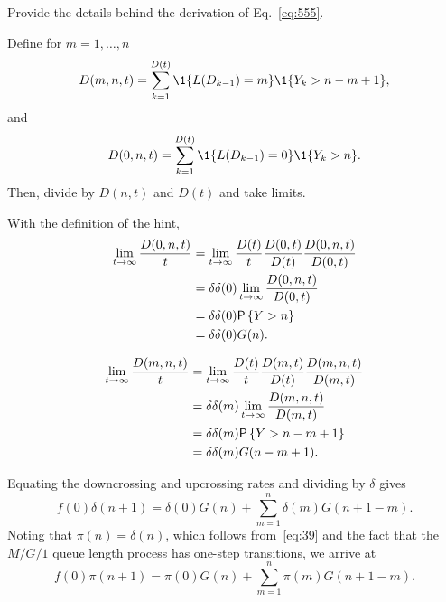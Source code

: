 \begin{exercise}
Provide the details behind the derivation of Eq.~\ref{eq:555}.
\begin{hint}
Define for $m=1,\ldots, n$
\begin{equation*}
  D(m, n, t) = \sum_{k=1}^{D(t)}\1{L(D_{k-1})=m}\1{Y_k>n-m+1},
\end{equation*}
and 
\begin{equation*}
  D(0, n, t) = \sum_{k=1}^{D(t)}\1{L(D_{k-1})=0}\1{Y_k>n}.
\end{equation*}
Then, divide by $D(n,t)$ and $D(t)$ and take limits.
\end{hint}
\begin{solution}
With the definition of the hint, 
\begin{equation*}
  \begin{split}
  \lim_{t\to\infty} \frac{  D(0, n, t)}t 
&=   \lim_{t\to\infty}  \frac{D(t)}t \frac{D(0, t)}{D(t)}\frac{ D(0, n, t)}{D(0,t)} \\
&=   \delta \delta(0) \lim_{t\to\infty} \frac{ D(0, n, t)}{D(0,t)} \\
&=   \delta \delta(0) \P{Y>n}\\
& = \delta \delta(0) G(n).
  \end{split}
\end{equation*}

\begin{equation*}
  \begin{split}
  \lim_{t\to\infty} \frac{  D(m, n, t)}t 
&=   \lim_{t\to\infty}  \frac{D(t)}t \frac{D(m, t)}{D(t)}\frac{ D(m, n, t)}{D(m,t)} \\
&=   \delta \delta(m) \lim_{t\to\infty} \frac{ D(m, n, t)}{D(m,t)} \\
&=   \delta \delta(m) \P{Y>n-m+1}\\
& = \delta \delta(m) G(n-m+1).
  \end{split}
\end{equation*}
\end{solution}
\end{exercise}

Equating the downcrossing and upcrossing rates and dividing
by $\delta$ gives
\begin{equation*}
  f(0) \delta(n+1) = \delta(0) G(n) + \sum_{m=1}^{n} \delta(m) G(n+1-m).
\end{equation*}
Noting that $\pi(n) = \delta(n)$, which follows from~\eqref{eq:39} and
the fact that the $M/G/1$ queue length process has one-step
transitions, we arrive at
\begin{equation}\label{eq:72}
  f(0) \pi(n+1) = \pi(0) G(n) + \sum_{m=1}^{n} \pi(m) G(n+1-m).
\end{equation}

